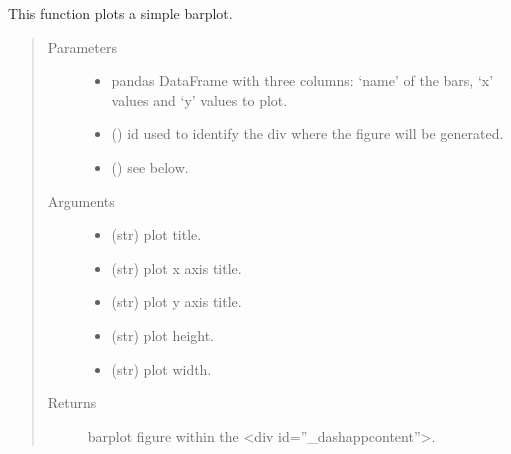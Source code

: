 \documentclass[letterpaper,10pt,english]{sphinxmanual}
\begin{document}
\begin{fulllineitems}
\label{\detokenize{_autosummary/analytics_core.viz:analytics_core.viz.viz.get_barplot}}
This function plots a simple barplot.
\begin{quote}\begin{description}
\item[{Parameters}] \leavevmode\begin{itemize}
\item {} 
 \textendash{} pandas DataFrame with three columns: ‘name’ of the bars, ‘x’ values and ‘y’ values to plot.

\item {} 
 () \textendash{} id used to identify the div where the figure will be generated.

\item {} 
 () \textendash{} see below.

\end{itemize}

\item[{Arguments}] \leavevmode\begin{itemize}
\item {} 
 (str) \textendash{} plot title.

\item {} 
 (str) \textendash{} plot x axis title.

\item {} 
 (str) \textendash{} plot y axis title.

\item {} 
 (str) \textendash{} plot height.

\item {} 
 (str) \textendash{} plot width.

\end{itemize}

\item[{Returns}] \leavevmode
barplot figure within the \textless{}div id=”\_dash\sphinxhyphen{}app\sphinxhyphen{}content”\textgreater{}.


\end{description}
\end{quote}
\end{fulllineitems}
\end{document}
